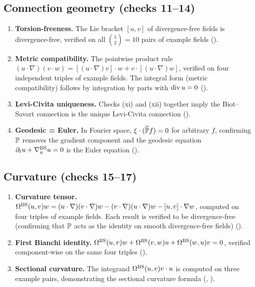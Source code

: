 \subsection{Connection geometry (checks 11--14)}\label{sec:sympy-ch03-conn}

\begin{enumerate}[resume,label=(\roman*)]
  \item \textbf{Torsion-freeness.}  The Lie bracket $[u,v]$ of divergence-free fields
    is divergence-free, verified on all $\binom{5}{2} = 10$ pairs of example fields
    ().

  \item \textbf{Metric compatibility.}  The pointwise product rule
    $(u\cdot\nabla)(v\cdot w) = [(u\cdot\nabla)v]\cdot w + v\cdot[(u\cdot\nabla)w]$,
    verified on four independent triples of example fields.
    The integral form (metric compatibility) follows by integration by parts
    with $\operatorname{div} u = 0$ ().

  \item \textbf{Levi-Civita uniqueness.}  Checks (xi) and (xii) together
    imply the Biot--Savart connection is the unique Levi-Civita connection
    ().

  \item \textbf{Geodesic = Euler.}  In Fourier space, $\xi\cdot(\widehat{\mathbb{P}}f) = 0$
    for arbitrary $f$, confirming $\mathbb{P}$ removes the gradient component and the
    geodesic equation $\partial_t u + \nabla^{\mathrm{BS}}_u u = 0$ is the Euler equation
    ().
\end{enumerate}

\subsection{Curvature (checks 15--17)}\label{sec:sympy-ch03-curv}

\begin{enumerate}[resume,label=(\roman*)]
  \item \textbf{Curvature tensor.}
    $\Omega^{\mathrm{BS}}(u,v)w = (u\cdot\nabla)(v\cdot\nabla)w - (v\cdot\nabla)(u\cdot\nabla)w
    - [u,v]\cdot\nabla w$,
    computed on four triples of example fields.  Each result is verified to be
    divergence-free (confirming that $\mathbb{P}$ acts as the identity on smooth
    divergence-free fields) ().

  \item \textbf{First Bianchi identity.}
    $\Omega^{\mathrm{BS}}(u,v)w + \Omega^{\mathrm{BS}}(v,w)u + \Omega^{\mathrm{BS}}(w,u)v = 0$,
    verified component-wise on the same four triples ().

  \item \textbf{Sectional curvature.}  The integrand
    $\Omega^{\mathrm{BS}}(u,v)v\cdot u$ is computed on three example pairs, demonstrating the
    sectional curvature formula (,
    ).
\end{enumerate}

